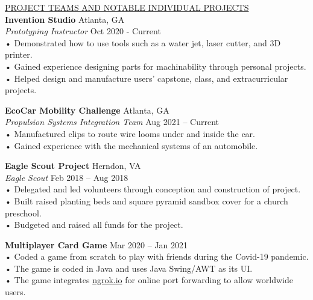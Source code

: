\documentclass{article}
\begin{document}
\underline{\Large P\normalsize ROJECT TEAMS AND NOTABLE INDIVIDUAL PROJECTS\qquad\qquad\qquad\qquad\qquad\qquad\qquad\qquad\qquad}\\                     

\large\textbf{Invention Studio} \hfill Atlanta, GA\\
\large \textit{Prototyping Instructor} \hfill Oct 2020 - Current\\
\qquad • \quad Demonstrated how to use tools such as a water jet, laser cutter, and 3D printer.\\
\qquad • \quad Gained experience designing parts for machinability through personal projects.\\
\qquad • \quad Helped design and manufacture users’ capstone, class, and extracurricular projects.\\
\vspace{3mm} %

\large\textbf{EcoCar Mobility Challenge}    \hfill Atlanta, GA\\
\large\textit{Propulsion Systems Integration Team} \hfill Aug 2021 – Current\\
\qquad • \quad Manufactured clips to route wire looms under and inside the car.\\
\qquad • \quad Gained experience with the mechanical systems of an automobile.\\\vspace{3mm} %

\large\textbf{Eagle Scout Project}  \hfill Herndon, VA\\
\large\textit{Eagle Scout} \hfill Feb 2018 – Aug 2018\\
\qquad • \quad Delegated and led volunteers through conception and construction of project.\\
\qquad • \quad Built raised planting beds and square pyramid sandbox cover for a church preschool.\\
\qquad • \quad Budgeted and raised all funds for the project.\\
\vspace{3mm} %

\large\textbf{Multiplayer Card Game} \hfill Mar 2020 – Jan 2021\\
\qquad • \quad Coded a game from scratch to play with friends during the Covid-19 pandemic.\\
\qquad • \quad The game is coded in Java and uses Java Swing/AWT as its UI.\\
\qquad • \quad The game integrates \href{https://ngrok.com/}{ngrok.io} for online port forwarding to allow worldwide users.\\
\vspace{3mm} %
\end{document}
